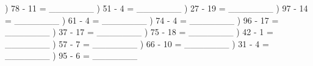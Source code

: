 \documentclass{article}%
\begin{document}
\newline%
) 78 {-} 11 = \_\_\_\_\_\_\_%
\newline%
\newline%
) 51 {-} 4 = \_\_\_\_\_\_\_%
\newline%
\newline%
) 27 {-} 19 = \_\_\_\_\_\_\_%
\newline%
\newline%
) 97 {-} 14 = \_\_\_\_\_\_\_%
\newline%
\newline%
) 61 {-} 4 = \_\_\_\_\_\_\_%
\newline%
\newline%
) 74 {-} 4 = \_\_\_\_\_\_\_%
\newline%
\newline%
) 96 {-} 17 = \_\_\_\_\_\_\_%
\newline%
\newline%
) 37 {-} 17 = \_\_\_\_\_\_\_%
\newline%
\newline%
) 75 {-} 18 = \_\_\_\_\_\_\_%
\newline%
\newline%
) 42 {-} 1 = \_\_\_\_\_\_\_%
\newline%
\newline%
) 57 {-} 7 = \_\_\_\_\_\_\_%
\newline%
\newline%
) 66 {-} 10 = \_\_\_\_\_\_\_%
\newline%
\newline%
) 31 {-} 4 = \_\_\_\_\_\_\_%
\newline%
\newline%
) 95 {-} 6 = \_\_\_\_\_\_\_%
\newline%
\newline%
\newline%
\end{document}
